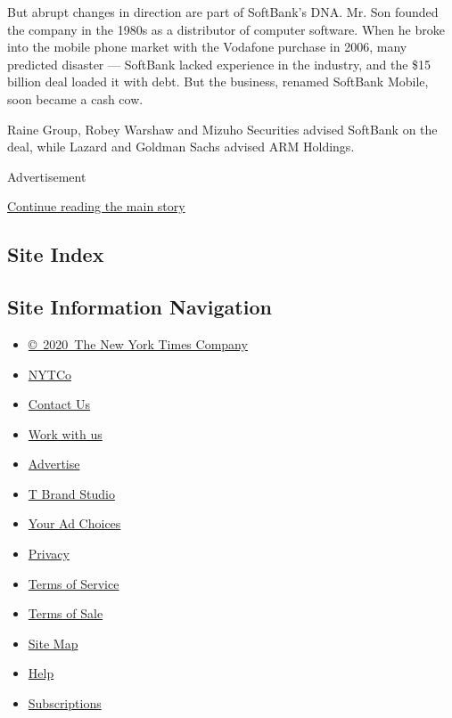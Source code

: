 But abrupt changes in direction are part of SoftBank's DNA. Mr. Son
founded the company in the 1980s as a distributor of computer software.
When he broke into the mobile phone market with the Vodafone purchase in
2006, many predicted disaster --- SoftBank lacked experience in the
industry, and the \$15 billion deal loaded it with debt. But the
business, renamed SoftBank Mobile, soon became a cash cow.

Raine Group, Robey Warshaw and Mizuho Securities advised SoftBank on the
deal, while Lazard and Goldman Sachs advised ARM Holdings.

Advertisement

\protect\hyperlink{after-bottom}{Continue reading the main story}

\hypertarget{site-index}{%
\subsection{Site Index}\label{site-index}}

\hypertarget{site-information-navigation}{%
\subsection{Site Information
Navigation}\label{site-information-navigation}}

\begin{itemize}
\tightlist
\item
  \href{https://help.nytimes.com/hc/en-us/articles/115014792127-Copyright-notice}{©~2020~The
  New York Times Company}
\end{itemize}

\begin{itemize}
\tightlist
\item
  \href{https://www.nytco.com/}{NYTCo}
\item
  \href{https://help.nytimes.com/hc/en-us/articles/115015385887-Contact-Us}{Contact
  Us}
\item
  \href{https://www.nytco.com/careers/}{Work with us}
\item
  \href{https://nytmediakit.com/}{Advertise}
\item
  \href{http://www.tbrandstudio.com/}{T Brand Studio}
\item
  \href{https://www.nytimes.com/privacy/cookie-policy\#how-do-i-manage-trackers}{Your
  Ad Choices}
\item
  \href{https://www.nytimes.com/privacy}{Privacy}
\item
  \href{https://help.nytimes.com/hc/en-us/articles/115014893428-Terms-of-service}{Terms
  of Service}
\item
  \href{https://help.nytimes.com/hc/en-us/articles/115014893968-Terms-of-sale}{Terms
  of Sale}
\item
  \href{https://spiderbites.nytimes.com}{Site Map}
\item
  \href{https://help.nytimes.com/hc/en-us}{Help}
\item
  \href{https://www.nytimes.com/subscription?campaignId=37WXW}{Subscriptions}
\end{itemize}
